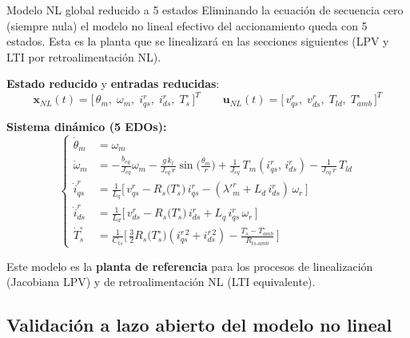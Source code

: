 \documentclass[aspectratio=169,t]{beamer}
\begin{document}
\begin{frame}{Modelo NL global reducido a 5 estados}
{\small\color{uncGray}Eliminando la ecuación de secuencia cero (siempre nula) el modelo no lineal efectivo del accionamiento queda con 5 estados. Esta es la planta que se linealizará en las secciones siguientes (LPV y LTI por retroalimentación NL).}\par
\vspace{2mm}

\textbf{Estado reducido} y \textbf{entradas reducidas}:
\begin{equation*}
\bm{x}_{NL}(t) = \big[\,\theta_m,\;\omega_m,\;i_{qs}^{r},\;i_{ds}^{r},\;T_s^\circ\,\big]^T
\qquad
\bm{u}_{NL}(t) = \big[\,v_{qs}^{r},\;v_{ds}^{r},\;T_{ld},\;T_{amb}^\circ\,\big]^T
\end{equation*}

\textbf{Sistema dinámico (5 EDOs):}
\footnotesize
\begin{equation*}
\left\{
\begin{aligned}
\dot{\theta}_m &= \omega_m \\
\dot{\omega}_m &= -\tfrac{b_{eq}}{J_{eq}}\omega_m - \tfrac{g\,k_l}{J_{eq}\,r}\sin\!\big(\tfrac{\theta_m}{r}\big) + \tfrac{1}{J_{eq}}\,T_m(i_{qs}^{r},\,i_{ds}^{r}) - \tfrac{1}{J_{eq}\,r}\,T_{ld} \\
\dot{i}_{qs}^{r} &= \tfrac{1}{L_q}\!\big[\,v_{qs}^{r} - R_s\!\big(T_s^\circ\big)\, i_{qs}^{r} - (\lambda'^r_m + L_d\,i_{ds}^{r})\,\omega_r\,\big] \\
\dot{i}_{ds}^{r} &= \tfrac{1}{L_d}\!\big[\,v_{ds}^{r} - R_s\!\big(T_s^\circ\big)\, i_{ds}^{r} + L_q\,i_{qs}^{r}\,\omega_r\,\big] \\
\dot{T}_s^\circ &= \tfrac{1}{C_{ts}}\!\big[\,\tfrac{3}{2}R_s\!\big(T_s^\circ\big)(i_{qs}^{r\,2}+i_{ds}^{r\,2}) - \tfrac{T_s^\circ - T_{amb}^\circ}{R_{ts\text{-}amb}}\,\big]
\end{aligned}\right.
\end{equation*}
\normalsize

\vspace{1mm}
{\small Este modelo es la \textbf{planta de referencia} para los procesos de linealización (Jacobiana LPV) y de retroalimentación NL (LTI equivalente).}
\end{frame}

\subsection{Validación a lazo abierto del modelo no lineal}
\end{document}
